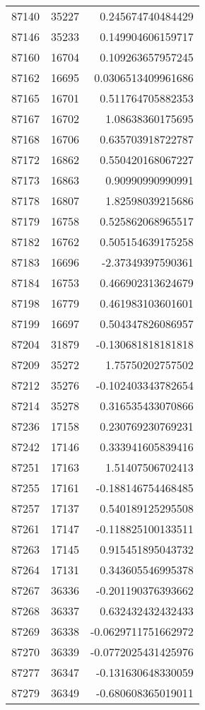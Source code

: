 \begin{tabular}{r | r | r}
87140 & 35227 & 0.245674740484429 \\
87146 & 35233 & 0.149904606159717 \\
87160 & 16704 & 0.109263657957245 \\
87162 & 16695 & 0.0306513409961686 \\
87165 & 16701 & 0.511764705882353 \\
87167 & 16702 & 1.08638360175695 \\
87168 & 16706 & 0.635703918722787 \\
87172 & 16862 & 0.550420168067227 \\
87173 & 16863 & 0.90990990990991 \\
87178 & 16807 & 1.82598039215686 \\
87179 & 16758 & 0.525862068965517 \\
87182 & 16762 & 0.505154639175258 \\
87183 & 16696 & -2.37349397590361 \\
87184 & 16753 & 0.466902313624679 \\
87198 & 16779 & 0.461983103601601 \\
87199 & 16697 & 0.504347826086957 \\
87204 & 31879 & -0.130681818181818 \\
87209 & 35272 & 1.75750202757502 \\
87212 & 35276 & -0.102403343782654 \\
87214 & 35278 & 0.316535433070866 \\
87236 & 17158 & 0.230769230769231 \\
87242 & 17146 & 0.333941605839416 \\
87251 & 17163 & 1.51407506702413 \\
87255 & 17161 & -0.188146754468485 \\
87257 & 17137 & 0.540189125295508 \\
87261 & 17147 & -0.118825100133511 \\
87263 & 17145 & 0.915451895043732 \\
87264 & 17131 & 0.343605546995378 \\
87267 & 36336 & -0.201190376393662 \\
87268 & 36337 & 0.632432432432433 \\
87269 & 36338 & -0.0629711751662972 \\
87270 & 36339 & -0.0772025431425976 \\
87277 & 36347 & -0.131630648330059 \\
87279 & 36349 & -0.680608365019011 \\

\end{tabular}
